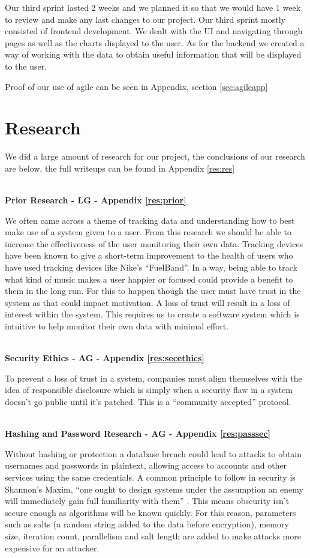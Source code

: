 \documentclass[10pt, notitlepage]{report}
\begin{document}
Our third sprint lasted 2 weeks and we planned it so that we would have 1 week to review and make any last changes to our project. Our third sprint mostly consisted of frontend development. We dealt with the UI and navigating through pages as well as the charts displayed to the user. As for the backend we created a way of working with the data to obtain useful information that will be displayed to the user. 

Proof of our use of agile can be seen in Appendix, section \ref{sec:agileapp}

\chapter{Research}

We did a large amount of research for our project, the conclusions of our research are below, the full writeups can be found in Appendix \ref{res:res}

\leavevmode \\
\textbf{Prior Research - LG - Appendix \ref{res:prior}}

We often came across a theme of tracking data and understanding how to best make use of a system given to a user. From this research we should be able to increase the effectiveness of the user monitoring their own data. Tracking devices have been known to give a short-term improvement to the health of users who have used tracking devices like Nike’s “FuelBand”. In a way, being able to track what kind of music makes a user happier or focused could provide a benefit to them in the long run. For this to happen though the user must have trust in the system as that could impact motivation. A loss of trust will result in a loss of interest within the system. This requires us to create a software system which is intuitive to help monitor their own data with minimal effort.

\leavevmode \\
\textbf{Security Ethics - AG - Appendix \ref{res:secethics}}

To prevent a loss of trust in a system, companies must align themselves with the idea of responsible disclosure which is simply when a security flaw in a system doesn’t go public until it’s patched. This is a “community accepted” protocol.

\leavevmode \\
\textbf{Hashing and Password Research - AG - Appendix \ref{res:passsec}}

Without hashing or protection a database breach could lead to attacks to obtain usernames and passwords in plaintext, allowing access to accounts and other services using the same 
credentials. A common principle to follow in security is Shannon’s Maxim, “one ought to design systems under the assumption an enemy will immediately gain full familiarity with them” \cite{Shannon1949}. This means obscurity isn’t secure enough as algorithms will be known quickly. For this reason, parameters such as salts (a random string added to the data before encryption), memory size, iteration count, parallelism and salt length are added to make attacks more expensive for an attacker.
\end{document}
